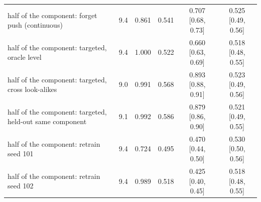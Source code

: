 \begin{tabular}{lccccc}
half of the component: forget push (continuous) & 9.4 & 0.861 & 0.541 & 0.707 [0.68, 0.73] & 0.525 [0.49, 0.56] \\
half of the component: targeted, oracle level & 9.4 & 1.000 & 0.522 & 0.660 [0.63, 0.69] & 0.518 [0.48, 0.55] \\
half of the component: targeted, cross look-alikes & 9.0 & 0.991 & 0.568 & 0.893 [0.88, 0.91] & 0.523 [0.49, 0.56] \\
half of the component: targeted, held-out same component & 9.1 & 0.992 & 0.586 & 0.879 [0.86, 0.90] & 0.521 [0.49, 0.55] \\
half of the component: retrain seed 101 & 9.4 & 0.724 & 0.495 & 0.470 [0.44, 0.50] & 0.530 [0.50, 0.56] \\
half of the component: retrain seed 102 & 9.4 & 0.989 & 0.518 & 0.425 [0.40, 0.45] & 0.518 [0.48, 0.55] \\
\bottomrule
\end{tabular}
